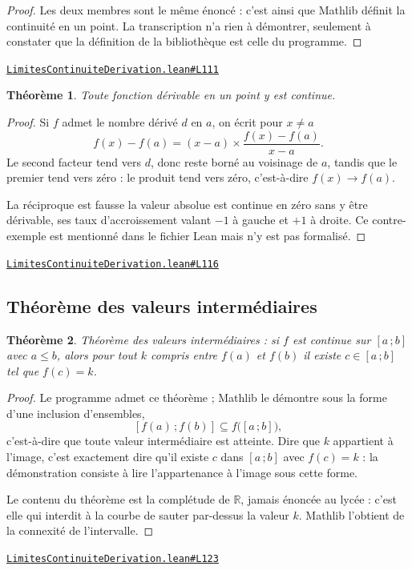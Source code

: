 \documentclass[11pt,a4paper]{article}
\theoremstyle{definition}
\theoremstyle{plain}
\newtheorem{theoreme}{Théorème}
\newcommand{\source}[2]{\par\smallskip\noindent\hfill{\footnotesize\href{#1}{\texttt{#2}}}\par\smallskip}
\begin{document}
\begin{proof}
Les deux membres sont le même énoncé : c'est ainsi que Mathlib définit la continuité en un
point. La transcription n'a rien à démontrer, seulement à constater que la définition de la
bibliothèque est celle du programme.
\end{proof}
\source{https://github.com/Commutator-IO/learn-lean/blob/main/courses/02-lycee/04-limites-continuite-derivation/LimitesContinuiteDerivation.lean\#L111}{LimitesContinuiteDerivation.lean\#L111}

\begin{theoreme}
Toute fonction dérivable en un point y est continue.
\end{theoreme}

\begin{proof}
Si $f$ admet le nombre dérivé $d$ en $a$, on écrit pour $x \ne a$
\[ f(x) - f(a) = (x - a) \times \frac{f(x) - f(a)}{x - a} . \]
Le second facteur tend vers $d$, donc reste borné au voisinage de $a$, tandis que le
premier tend vers zéro : le produit tend vers zéro, c'est-à-dire $f(x) \to f(a)$.

\medskip\noindent
La réciproque est fausse \textemdash{} la valeur absolue est continue en zéro sans y être
dérivable, ses taux d'accroissement valant $-1$ à gauche et $+1$ à droite. Ce
contre-exemple est mentionné dans le fichier Lean mais n'y est pas formalisé.
\end{proof}
\source{https://github.com/Commutator-IO/learn-lean/blob/main/courses/02-lycee/04-limites-continuite-derivation/LimitesContinuiteDerivation.lean\#L116}{LimitesContinuiteDerivation.lean\#L116}

\subsection{Théorème des valeurs intermédiaires}

\begin{theoreme}
Théorème des valeurs intermédiaires : si $f$ est continue sur $[a\,;b]$ avec $a \le b$,
alors pour tout $k$ compris entre $f(a)$ et $f(b)$ il existe $c \in [a\,;b]$ tel que
$f(c) = k$.
\end{theoreme}

\begin{proof}
Le programme admet ce théorème ; Mathlib le démontre sous la forme d'une inclusion
d'ensembles,
\[ [f(a)\,;f(b)] \subseteq f\bigl([a\,;b]\bigr) , \]
c'est-à-dire que toute valeur intermédiaire est atteinte. Dire que $k$ appartient à
l'image, c'est exactement dire qu'il existe $c$ dans $[a\,;b]$ avec $f(c) = k$ : la
démonstration consiste à lire l'appartenance à l'image sous cette forme.

\medskip\noindent
Le contenu du théorème est la complétude de $\mathbb{R}$, jamais énoncée au lycée : c'est
elle qui interdit à la courbe de \og{} sauter \fg{} par-dessus la valeur $k$. Mathlib
l'obtient de la connexité de l'intervalle.
\end{proof}
\source{https://github.com/Commutator-IO/learn-lean/blob/main/courses/02-lycee/04-limites-continuite-derivation/LimitesContinuiteDerivation.lean\#L123}{LimitesContinuiteDerivation.lean\#L123}
\end{document}
